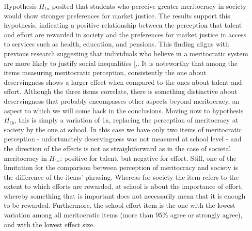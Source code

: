 \documentclass[
  12pt,
  letterpaper,
]{article}
\begin{document}
Hypothesis \(H_{1a}\) posited that students who perceive greater
meritocracy in society would show stronger preferences for market
justice. The results support this hypothesis, indicating a positive
relationship between the perception that talent and effort are rewarded
in society and the preferences for market justice in access to services
such as health, education, and pensions. This finding aligns with
previous research suggesting that individuals who believe in a
meritocratic system are more likely to justify social inequalities
{[},\citeproc{ref-wiederkehr_belief_2015}{4}{]}.
It is noteworthy that among the items measuring meritocratic perception,
consistently the one about deservingness shows a larger effect when
compared to the ones about talent and effort. Although the three items
correlate, there is something distinctive about deservingness that
probably encompasses other aspects beyond meritocracy, an aspect to
which we will come back in the conclusions. Moving now to hypothesis
\(H_{1b}\), this is simply a variation of 1a, replacing the perception
of meritocracy at society by the one at school. In this case we have
only two items of meritocratic perception - unfortunately deservingness
was not measured at school level - and the direction of the effects is
not as straightforward as in the case of societal meritocracy in
\(H_{1a}\): positive for talent, but negative for effort. Still, one of
the limitation for the comparison between perception of meritocracy and
society is the difference of the items' phrasing. Whereas for society
the item refers to the extent to which efforts are rewarded, at school
is about the importance of effort, whereby something that is important
does not necessarily mean that it is enough to be rewarded. Furthermore,
the school-effort item is the one with the lowest variation among all
meritocratic items (more than 95\% agree or strongly agree), and with
the lowest effect size.
\end{document}
